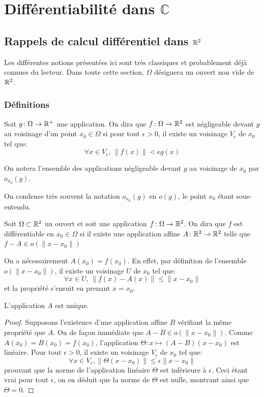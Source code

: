 \chapter{Différentiabilité dans $\mathbb{C}$}
\section{Rappels de calcul différentiel dans $\mathbb{R}^2$}
Les différentes notions présentées ici sont très classiques et probablement
déjà connues du lecteur. Dans toute cette section, $\Omega$ désignera un ouvert non vide de $\mathbb{R}^2$.
\subsection{Définitions}
\begin{fdefn}
Soit $g \colon \Omega \to \mathbb{R}^+$ une application. On dira que $f \colon \Omega \to \mathbb{R}^2$ est négligeable devant $g$ au
voisinage d'un point $x_0 \in \Omega$ si pour tout $\epsilon > 0$, il existe un voisinage $V_\epsilon$ de $x_0$ tel que:
\[
\forall x \in V_\epsilon, \, \|f(x)\| < \epsilon g(x)
\]
\end{fdefn}
\begin{notation}
On notera l'ensemble des applications négligeable devant $g$ au voisinage de $x_0$ par $o_{x_0}(g)$. 
\end{notation}
\begin{rem}
On condense très souvent la notation $o_{x_0}(g)$ en $o(g)$, le point $x_0$ étant sous-entendu.
\end{rem}
\begin{fdefn}\label{def:1.1}
Soit $\Omega \subset \mathbb{R}^2$ un ouvert et soit une application $f \colon \Omega \to \mathbb{R}^2$.
On dira que $f$ est différentiable en $x_0 \in \Omega$ si il existe une application affine $A \colon \mathbb{R}^2 \to \mathbb{R}^2$ telle
que $f-A \in o(\|x-x_0\|)$
\end{fdefn}
On a nécessairement $A(x_0)=f(x_0)$. En effet, par définition de l'ensemble $o(\|x-x_0\|)$, il existe un voisinage $U$ de $x_0$ tel que:
\[
\forall x \in U, \, \|f(x)-A(x)\| \leq \|x-x_0\|
\]
et la propriété s'ensuit en prenant $x=x_0$.
\begin{prop}
L'application $A$ est unique.
\end{prop}
\begin{proof}
Supposons l'existence d'une application affine $B$ vérifiant la même propriété que $A$. On de façon immédiate que $A-B \in o(\|x-x_0\|)$. Comme $A(x_0)=B(x_0)=f(x_0)$, l'application $\Theta \colon x \mapsto (A-B)(x-x_0)$ est linéaire.
Pour tout $\epsilon > 0$, il existe un voisinage $V_\epsilon$ de $x_0$ tel que:
\[
\forall x \in V_\epsilon, \|\Theta(x-x_0)\| \leq \epsilon \|x-x_0\|
\]
prouvant que la norme de l'application linéaire $\Theta$ est inférieure à $\epsilon$. Ceci étant vrai pour tout $\epsilon$, on en déduit que la norme de $\Theta$ est nulle, montrant ainsi que $\Theta=0$.
\end{proof}
